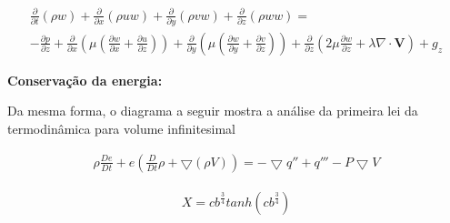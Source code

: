 \documentclass[]{article}
\begin{document}
\begin{equation}
	\begin{aligned}
	\frac{\partial}{\partial t} (\rho w) + \frac{\partial}{\partial x} (\rho u w) + \frac{\partial}{\partial y} (\rho v w) + \frac{\partial}{\partial z} (\rho w w) = \\
	- \frac{\partial p}{\partial z} + \frac{\partial}{\partial x} \left( \mu \left( \frac{\partial w}{\partial x} + \frac{\partial u}{\partial z} \right) \right) +
	\frac{\partial}{\partial y} \left( \mu \left( \frac{\partial w}{\partial y} + \frac{\partial v}{\partial z} \right) \right) +
	\frac{\partial}{\partial z} \left( 2 \mu \frac{\partial w}{\partial z} + \lambda \nabla \cdot \mathbf{V} \right) +  g_z
	\end{aligned}
\end{equation}

\textbf{Conservação da energia:} 

Da mesma forma, o diagrama a seguir mostra a análise da primeira lei da termodinâmica para volume infinitesimal





\begin{equation}
	\begin{aligned}
		\rho \frac{ De}{Dt} + e(\frac{D}{D t} \rho +  \bigtriangledown (\rho V)) = -\bigtriangledown q'' + q''' - P\bigtriangledown V 
	\end{aligned}
\end{equation}


\begin{equation}
	\begin{aligned}
		X = cb^{\frac{3}{4}}tanh(cb^{\frac{3}{4}}) 
	\end{aligned}
\end{equation}
\end{document}
